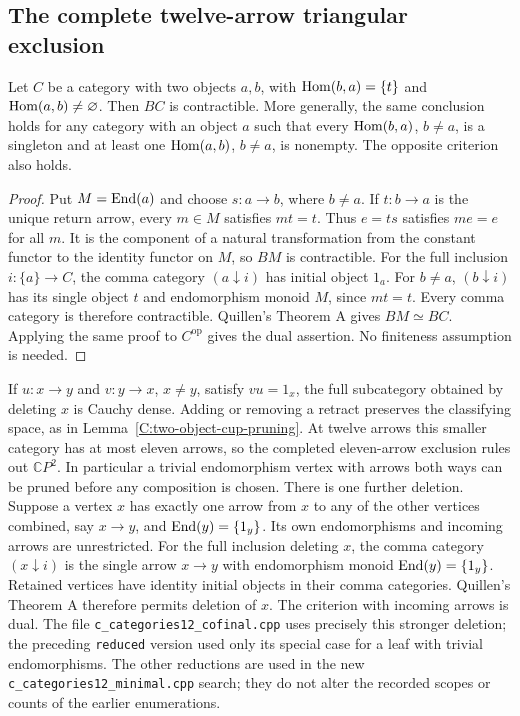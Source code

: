 \subsection{The complete twelve-arrow triangular exclusion}

\begin{lemma}\label{C:singleton-return}
Let $C$ be a category with two objects $a,b$, with
$\operatorname{Hom}(b,a)=\{t\}$ and $\operatorname{Hom}(a,b)\ne\varnothing$.
Then $BC$ is contractible. More generally, the same conclusion holds
for any category with an object $a$ such that every
$\operatorname{Hom}(b,a)$, $b\ne a$, is a singleton and at least one
$\operatorname{Hom}(a,b)$, $b\ne a$, is nonempty. The opposite criterion also holds.
\end{lemma}
\begin{proof}
Put $M=\operatorname{End}(a)$ and choose $s:a\to b$, where $b\ne a$.
If $t:b\to a$ is the unique return arrow, every $m\in M$
satisfies $mt=t$. Thus $e=ts$ satisfies $me=e$ for all $m$.
It is the component of a natural transformation from the constant
functor to the identity functor on $M$, so $BM$ is contractible.
For the full inclusion $i:\{a\}\to C$, the comma category
$(a\downarrow i)$ has initial object $1_a$. For $b\ne a$,
$(b\downarrow i)$ has its single object $t$ and endomorphism
monoid $M$, since $mt=t$. Every comma category is therefore
contractible. Quillen's Theorem A gives $BM\simeq BC$.
Applying the same proof to $C^{\mathrm{op}}$ gives the dual assertion.
No finiteness assumption is needed.
\end{proof}

\begin{remark}\label{C:twelve-retract-pruning}
If $u:x\to y$ and $v:y\to x$, $x\ne y$, satisfy $vu=1_x$,
the full subcategory obtained by deleting $x$ is Cauchy dense.
Adding or removing a retract preserves the classifying space, as in
Lemma~\ref{C:two-object-cup-pruning}. At twelve arrows this smaller
category has at most eleven arrows, so the completed eleven-arrow
exclusion rules out $\mathbb CP^2$. In particular a trivial
endomorphism vertex with arrows both ways can be pruned before any
composition is chosen. There is one further deletion.  Suppose a vertex $x$ has exactly
one arrow from $x$ to any of the other vertices combined, say
$x\to y$, and $\operatorname{End}(y)=\{1_y\}$.  Its own endomorphisms and
incoming arrows are unrestricted.  For the full inclusion deleting
$x$, the comma category $(x\downarrow i)$ is the single arrow
$x\to y$ with endomorphism monoid $\operatorname{End}(y)=\{1_y\}$.
Retained vertices have identity initial objects in their comma
categories.  Quillen's Theorem A therefore permits deletion of $x$.
The criterion with incoming arrows is dual.  The file
\texttt{c\_categories12\_cofinal.cpp} uses precisely this stronger
deletion; the preceding \texttt{reduced} version used only its
special case for a leaf with trivial endomorphisms.
The other reductions are used in the new
\texttt{c\_categories12\_minimal.cpp} search; they do not alter the
recorded scopes or counts of the earlier enumerations.
\end{remark}

